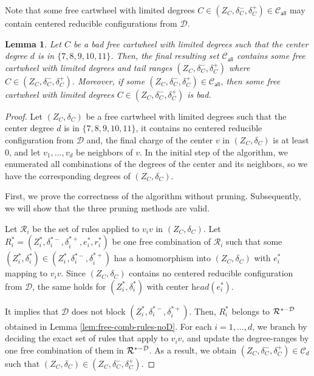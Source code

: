 \documentclass[10pt,a4paper]{article}
\newtheorem{lem}[thm]{Lemma}
\def\head{\textit{head}}
\begin{document}
Note that some free cartwheel with limited degrees $C \in (Z_C, \delta_C^-, \delta_C^+) \in \mathcal{C}_{\textsf{all}}$ may contain centered reducible configurations from $\mathcal{D}$.

\begin{lem}
    Let $C$ be a bad free cartwheel with limited degrees such that the center degree $d$ is in $\{7,8,9,10,11\}$.
    Then, the final resulting set $\mathcal{C}_{\textsf{all}}$ contains some free cartwheel with limited degrees and tail ranges $(Z_C, \delta_C^-, \delta_C^+)$ where $C \in (Z_C, \delta_C^-, \delta_C^+)$.
    Moreover, if some $(Z_C, \delta_C^-, \delta_C^+) \in \mathcal{C}_{\textsf{all}}$, then some free cartwheel with limited degrees $C \in (Z_C, \delta_C^-, \delta_C^+)$ is bad.
\end{lem}
\begin{proof}
    Let $(Z_C, \delta_C)$ be a free cartwheel with limited degrees such that the center degree $d$ is in $\{7,8,9,10,11\}$, it contains no centered reducible configuration from $\mathcal{D}$ and, the final charge of the center $v$ in $(Z_C, \delta_C)$ is at least 0, and let $v_1,\ldots,v_{d}$ be neighbors of $v$.
    In the initial step of the algorithm, we enumerated all combinations of the degrees of the center and its neighbors, so we have the corresponding degrees of $(Z_C, \delta_C)$.

    First, we prove the correctness of the algorithm without pruning.
    Subsequently, we will show that the three pruning methods are valid.
    
    Let $\mathcal{R}_i$ be the set of rules applied to $v_iv$ in $(Z_C, \delta_C)$.
    Let $R_i^* = (Z_i^*, \delta_i^{*-}, \delta_i^{*+}, e_i^*, r_i^*)$ be one free combination of $\mathcal{R}_i$ such that
    some $(Z_i^*, \delta_i^*) \in (Z_i^*, \delta_i^{*-}, \delta_i^{*+})$ has a homomorphism into $(Z_C, \delta_C)$ with $e_i^*$ mapping to $v_iv$.
    Since $(Z_C, \delta_C)$ contains no centered reducible configuration from $\mathcal{D}$, the same holds for $(Z_i^*, \delta_i^*)$ with center $\head(e_i^*)$.
    
    It implies that $\mathcal{D}$ does not block $(Z_i^*, \delta_i^{*-}, \delta_i^{*+})$.
    Then, $R^*_i$ belongs to $\mathcal{R}^{*-\mathcal{D}}$ obtained in Lemma \ref{lem:free-comb-rules-noD}.
    For each $i=1,\ldots,d$, we branch by deciding the exact set of rules that apply to $v_iv$, and update the degree-ranges by one free combination of them in $\mathcal{R}^{*-\mathcal{D}}$.
    As a result, we obtain $(Z_C, \delta_C^-, \delta_C^+) \in \mathcal{C}_d$ such that $(Z_C, \delta_C) \in (Z_C, \delta_C^-, \delta_C^+)$.


\end{proof}
\end{document}
